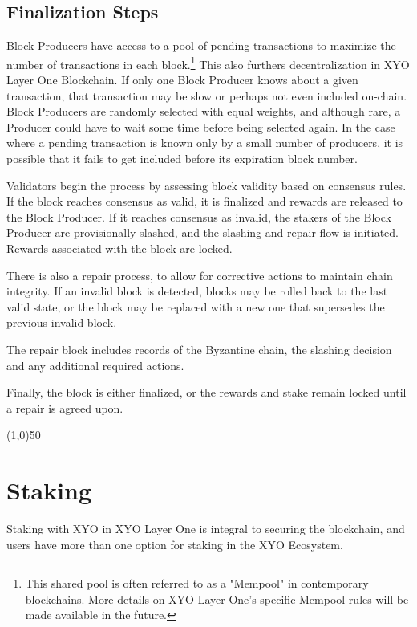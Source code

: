 \documentclass{article}
\begin{document}
\subsection{Finalization Steps}
Block Producers have access to a pool of pending transactions to maximize the
number of transactions in each block.\footnote{This shared pool is often
    referred to as a "Mempool" in contemporary blockchains. More details on XYO
    Layer One's specific Mempool rules will be made available in the future.} This
also furthers decentralization in XYO Layer One Blockchain. If only one Block
Producer knows about a given transaction, that transaction may be slow or
perhaps not even included on-chain. Block Producers are randomly selected with
equal weights, and although rare, a Producer could have to wait some time
before being selected again. In the case where a pending transaction is known
only by a small number of producers, it is possible that it fails to get
included before its expiration block number.

Validators begin the process by assessing block validity based on consensus
rules. If the block reaches consensus as valid, it is finalized and rewards are
released to the Block Producer. If it reaches consensus as invalid, the stakers
of the Block Producer are provisionally slashed, and the slashing and repair
flow is initiated. Rewards associated with the block are locked.

There is also a repair process, to allow for corrective actions to maintain
chain integrity. If an invalid block is detected, blocks may be rolled back to
the last valid state, or the block may be replaced with a new one that
supersedes the previous invalid block.

The repair block includes records of the Byzantine chain, the slashing decision
and any additional required actions.

Finally, the block is either finalized, or the rewards and stake remain locked
until a repair is agreed upon.

\begin{center}
    \line(1,0){50}
\end{center}

\section{Staking}
Staking with XYO in XYO Layer One is integral to securing the blockchain, and
users have more than one option for staking in the XYO Ecosystem.
\end{document}
